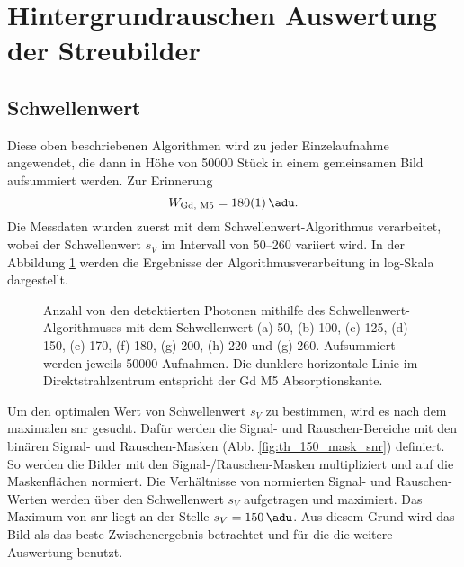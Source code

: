 \section{Hintergrundrauschen Auswertung der Streubilder}
\label{text:streuung_counting}
\subsection{Schwellenwert}
Diese oben beschriebenen Algorithmen wird zu jeder Einzelaufnahme angewendet, die dann in Höhe von \num{50000} Stück in einem gemeinsamen Bild aufsummiert werden. 
Zur Erinnerung
\begin{equation}
         W_{\text{Gd, M5}} =  \SI{180(1)}{\adu}.
\end{equation}
Die Messdaten wurden zuerst mit dem Schwellenwert-Algorithmus verarbeitet, wobei der Schwellenwert $s_V$ im Intervall von \SIrange{50}{260}{\adu} variiert wird. In der Abbildung \ref{fig:th_50_100_125_150_170_180_200_220_260} werden die Ergebnisse der Algorithmusverarbeitung in log-Skala dargestellt.
\begin{figure}[H]
    \centering
    
    \caption{Anzahl von den detektierten Photonen mithilfe des Schwellenwert-Algorithmuses mit dem Schwellenwert (a) \SI{50}{\adu}, (b) \SI{100}{\adu}, (c) \SI{125}{\adu}, (d) \SI{150}{\adu}, (e) \SI{170}{\adu}, (f) \SI{180}{\adu}, (g) \SI{200}{\adu}, (h) \SI{220}{\adu} und (g) \SI{260}{\adu}. Aufsummiert werden jeweils \num{50000} Aufnahmen. Die dunklere horizontale Linie im Direktstrahlzentrum entspricht der Gd M5 Absorptionskante.}
    \label{fig:th_50_100_125_150_170_180_200_220_260}
\end{figure}
%     
\noindent
Um den optimalen Wert von Schwellenwert $s_V$ zu bestimmen, wird es nach dem maximalen \gls{snr} gesucht. Dafür werden die Signal- und Rauschen-Bereiche mit den binären Signal- und Rauschen-Masken (Abb. \ref{fig:th_150_mask_snr}) definiert. So werden die Bilder mit den Signal-/Rauschen-Masken multipliziert und auf die Maskenflächen normiert. Die Verhältnisse von normierten Signal- und Rauschen-Werten werden über den Schwellenwert $s_V$ aufgetragen und maximiert. Das Maximum von \gls{snr} liegt an der Stelle $s_V = \SI{150}{\adu}$. Aus diesem Grund wird das Bild als das beste Zwischenergebnis betrachtet und für die die weitere Auswertung benutzt. 
